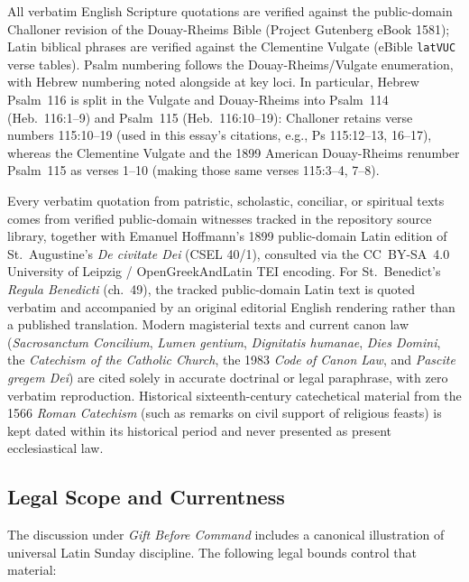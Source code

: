All verbatim English Scripture quotations are verified against the public-domain Challoner revision of the Douay-Rheims Bible (Project Gutenberg eBook 1581); Latin biblical phrases are verified against the Clementine Vulgate (eBible \texttt{latVUC} verse tables). Psalm numbering follows the Douay-Rheims/Vulgate enumeration, with Hebrew numbering noted alongside at key loci. In particular, Hebrew Psalm~116 is split in the Vulgate and Douay-Rheims into Psalm~114 (Heb.\ 116:1--9) and Psalm~115 (Heb.\ 116:10--19): Challoner retains verse numbers 115:10--19 (used in this essay's citations, e.g., Ps 115:12--13, 16--17), whereas the Clementine Vulgate and the 1899 American Douay-Rheims renumber Psalm~115 as verses 1--10 (making those same verses 115:3--4, 7--8).

Every verbatim quotation from patristic, scholastic, conciliar, or spiritual texts comes from verified public-domain witnesses tracked in the repository source library, together with Emanuel Hoffmann's 1899 public-domain Latin edition of St.\ Augustine's \emph{De civitate Dei} (CSEL 40/1), consulted via the CC~BY-SA~4.0 University of Leipzig / OpenGreekAndLatin TEI encoding. For St.\ Benedict's \emph{Regula Benedicti} (ch.\ 49), the tracked public-domain Latin text is quoted verbatim and accompanied by an original editorial English rendering rather than a published translation. Modern magisterial texts and current canon law (\emph{Sacrosanctum Concilium}, \emph{Lumen gentium}, \emph{Dignitatis humanae}, \emph{Dies Domini}, the \emph{Catechism of the Catholic Church}, the 1983 \emph{Code of Canon Law}, and \emph{Pascite gregem Dei}) are cited solely in accurate doctrinal or legal paraphrase, with zero verbatim reproduction. Historical sixteenth-century catechetical material from the 1566 \emph{Roman Catechism} (such as remarks on civil support of religious feasts) is kept dated within its historical period and never presented as present ecclesiastical law.

\subsection*{Legal Scope and Currentness}

The discussion under \emph{Gift Before Command} includes a canonical illustration of universal Latin Sunday discipline. The following legal bounds control that material:

